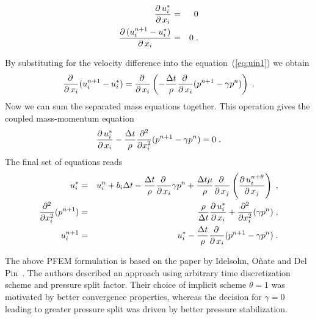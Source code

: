 \begin{eqnarray}\label{rce:mass}
	\mbox{$\displaystyle\frac{\partial \,{u^*_i}}{\partial \,{x_i}}$} &=& 0 \\
      \mbox{$\displaystyle\frac{\partial \,{(u^{n+1}_i-u^*_i)}}{\partial \,{x_i}}$} &=& 0\;.
\end{eqnarray}

By substituting for the velocity difference into the equation~(\ref{eq:uin1}) we obtain
\begin{equation}
\mbox{$\displaystyle\frac{\partial \,{}}{\partial \,{x_i}}$}(u^{n+1}_i - u^*_i) = \mbox{$\displaystyle\frac{\partial \,{}}{\partial \,{x_i}}$}\left(-\frac{\Delta t}{\rho}\mbox{$\displaystyle\frac{\partial \,{}}{\partial \,{x_i}}$}(p^{n+1}-\gamma p^n)\right)\;.
\end{equation}
Now we can sum the separated mass equations together. This operation gives the coupled mass-momentum equation
\begin{equation}
  \mbox{$\displaystyle\frac{\partial \,{u^*_i}}{\partial \,{x_i}}$} - \frac{\Delta t}{\rho}\frac{\partial^2}{\partial x^2_i}(p^{n+1}-\gamma p^n) = 0\;.
\end{equation}
The final set of equations reads
\begin{eqnarray}
u^*_i  &=& u^n_i+b_i\Delta t - \frac{\Delta t}{\rho}\mbox{$\displaystyle\frac{\partial \,{}}{\partial \,{x_i}}$}\gamma p^n+\frac{\Delta t\mu}{\rho}\mbox{$\displaystyle\frac{\partial \,{}}{\partial \,{x_j}}$}\left(\mbox{$\displaystyle\frac{\partial \,{u^{n+\theta}_i}}{\partial \,{x_j}}$}\right)\;,\\
\frac{\partial^2}{\partial x^2_i}(p^{n+1}) &=& \frac{\rho}{\Delta t}\mbox{$\displaystyle\frac{\partial \,{u^*_i}}{\partial \,{x_i}}$}+\frac{\partial^2}{\partial x^2_i}(\gamma p^n)\;, \\
u^{n+1}_i &=& u^*_i- \frac{\Delta t}{\rho}\mbox{$\displaystyle\frac{\partial \,{}}{\partial \,{x_i}}$}(p^{n+1}-\gamma p^n)\;.
\end{eqnarray}
\par
The above PFEM formulation is based on the paper by Idelsohn, O\~nate and Del Pin~\cite{Idelsohn04}. The authors described an approach using arbitrary time discretization scheme and pressure split factor. Their choice of implicit scheme $\theta = 1$ was motivated by better convergence properties, whereas the decision for $\gamma = 0$ leading to greater pressure split was driven by better pressure stabilization.
